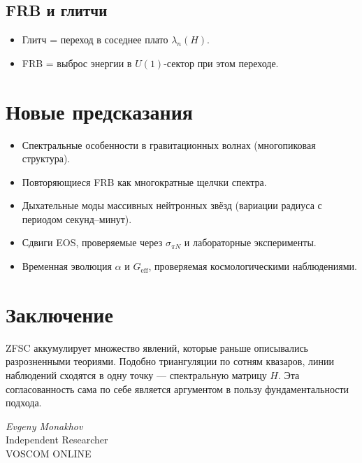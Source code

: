 \documentclass[a4paper,12pt]{article}
\begin{document}
\subsection*{FRB и глитчи}
\begin{itemize}
  \item Глитч = переход в соседнее плато $\lambda_n(H)$.
  \item FRB = выброс энергии в $U(1)$-сектор при этом переходе.
\end{itemize}

\section*{Новые предсказания}

\begin{itemize}
  \item Спектральные особенности в гравитационных волнах (многопиковая структура).
  \item Повторяющиеся FRB как многократные щелчки спектра.
  \item Дыхательные моды массивных нейтронных звёзд (вариации радиуса с периодом секунд--минут).
  \item Сдвиги EOS, проверяемые через $\sigma_{\pi N}$ и лабораторные эксперименты.
  \item Временная эволюция $\alpha$ и $G_{\text{eff}}$, проверяемая космологическими наблюдениями.
\end{itemize}

\section*{Заключение}
ZFSC аккумулирует множество явлений, которые раньше описывались разрозненными теориями.  
Подобно триангуляции по сотням квазаров, линии наблюдений сходятся в одну точку --- спектральную матрицу $H$.  
Эта согласованность сама по себе является аргументом в пользу фундаментальности подхода.

\vspace{2em}
\noindent
\textit{Evgeny Monakhov} \\
Independent Researcher \\
VOSCOM ONLINE
\end{document}
